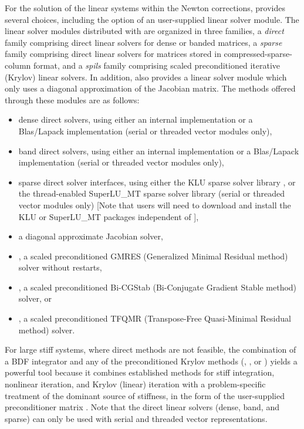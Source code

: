 For the solution of the linear systems within the Newton corrections, 
{\cvodes} provides several choices, including the option of an user-supplied
linear solver module. The linear solver modules distributed with {\sundials}
are organized in three families, a {\em direct} family comprising direct linear 
solvers for dense or banded matrices, a {\em sparse} family comprising
direct linear solvers for matrices stored in compressed-sparse-column
format, and a {\em spils} family comprising
scaled preconditioned iterative (Krylov) linear solvers. 
In addition, {\cvodes} also provides a linear solver module which only uses
a diagonal approximation of the Jacobian matrix. 
The methods offered through these modules are as follows:
\begin{itemize}
\item dense direct solvers, using either an internal implementation or 
  a Blas/Lapack implementation (serial or threaded vector modules only),
\item band direct solvers, using either an internal implementation or 
  a Blas/Lapack implementation (serial or threaded vector modules only),
\item sparse direct solver interfaces, using either the KLU sparse solver
  library \cite{DaPa:10,KLU_site}, or the thread-enabled SuperLU\_MT sparse
  solver library \cite{Li:05,DGL:99,SuperLUMT_site} (serial or threaded 
  vector modules only) [Note that users will need to download and install the 
  KLU or SuperLU\_MT packages independent of {\cvodes}],
\item a diagonal approximate Jacobian solver,
\item {\spgmr}, a scaled preconditioned GMRES (Generalized Minimal Residual method)
      solver without restarts,
\item {\spbcg}, a scaled preconditioned Bi-CGStab (Bi-Conjugate Gradient Stable
      method) solver, or
\item {\sptfqmr}, a scaled preconditioned TFQMR (Transpose-Free Quasi-Minimal
       Residual method) solver.
\end{itemize}
For large stiff systems, where direct methods are not feasible, the
combination of a BDF integrator and any of the preconditioned Krylov
methods ({\spgmr}, {\spbcg}, or {\sptfqmr}) yields a powerful tool
because it combines established methods for stiff integration,
nonlinear iteration, and Krylov (linear) iteration with a
problem-specific treatment of the dominant source of stiffness, in the
form of the user-supplied preconditioner matrix \cite{BrHi:89}.
Note that the direct linear solvers (dense, band, and sparse) can only be 
used with serial and threaded vector representations.

